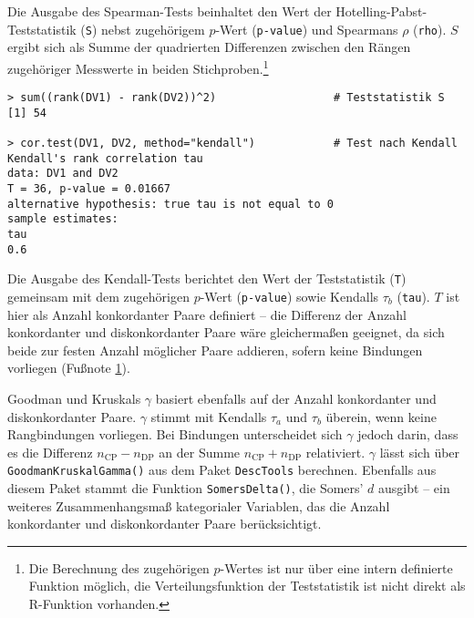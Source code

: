 Die Ausgabe des Spearman-Tests beinhaltet den Wert der Hotelling-Pabst-Teststatistik (\lstinline!S!) nebst zugehörigem $p$-Wert (\lstinline!p-value!) und Spearmans $\rho$ (\lstinline!rho!). $S$ ergibt sich als Summe der quadrierten Differenzen zwischen den Rängen zugehöriger Messwerte in beiden Stichproben.\footnote{\label{ftn:pKendall}Die Berechnung des zugehörigen $p$-Wertes ist nur über eine intern definierte Funktion möglich, die Verteilungsfunktion der Teststatistik ist nicht direkt als R-Funktion vorhanden.}
\begin{lstlisting}
> sum((rank(DV1) - rank(DV2))^2)                  # Teststatistik S
[1] 54

> cor.test(DV1, DV2, method="kendall")            # Test nach Kendall
Kendall's rank correlation tau
data: DV1 and DV2
T = 36, p-value = 0.01667
alternative hypothesis: true tau is not equal to 0
sample estimates:
tau
0.6
\end{lstlisting}

Die Ausgabe des Kendall-Tests berichtet den Wert der Teststatistik (\lstinline!T!) gemeinsam mit dem zugehörigen $p$-Wert (\lstinline!p-value!) sowie Kendalls $\tau_{b}$ (\lstinline!tau!). $T$ ist hier als Anzahl konkordanter Paare definiert -- die Differenz der Anzahl konkordanter und diskonkordanter Paare wäre gleichermaßen geeignet, da sich beide zur festen Anzahl möglicher Paare addieren, sofern keine Bindungen vorliegen (Fußnote \ref{ftn:pKendall}).

Goodman und Kruskals $\gamma$ basiert ebenfalls auf der Anzahl konkordanter und diskonkordanter Paare. $\gamma$ stimmt mit Kendalls $\tau_{a}$ und $\tau_{b}$ überein, wenn keine Rangbindungen vorliegen. Bei Bindungen unterscheidet sich $\gamma$ jedoch darin, dass es die Differenz $n_{\text{CP}} - n_{\text{DP}}$ an der Summe $n_{\text{CP}} + n_{\text{DP}}$ relativiert. $\gamma$ lässt sich über \lstinline!GoodmanKruskalGamma()! aus dem Paket \lstinline!DescTools! berechnen. Ebenfalls aus diesem Paket stammt die Funktion \lstinline!SomersDelta()!, die Somers' $d$ ausgibt -- ein weiteres Zusammenhangsmaß kategorialer Variablen, das die Anzahl konkordanter und diskonkordanter Paare berücksichtigt.

